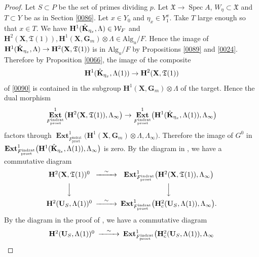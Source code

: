 \documentclass{amsart}
\theoremstyle{remark}
\numberwithin{equation}{section}
\newcommand{\tensor}{\mathbin{\otimes}}
\newcommand{\et}{\mathrm{et}}
\newcommand{\Gm}{\mathbf{G}_{m}}
\newcommand{\rat}{\mathrm{rat}}
\newcommand{\ind}{\mathrm{ind}}
\newcommand{\pro}{\mathrm{pro}}
\newcommand{\Alg}{\mathrm{Alg}}
\newcommand{\alg}[1]{\mathbf{#1}}
\DeclareMathOperator{\Spec}{Spec}
\DeclareMathOperator{\sheafext}{\alg{Ext}}
\begin{document}
\begin{proof}
	Let $S \subset P$ be the set of primes dividing $p$.
	Let $\mathfrak{X} \to \Spec A$, $W_{\eta} \subset \mathfrak{X}$ and $T \subset Y$
	be as in Section \ref{0086}.
	Let $x \in Y_{0}$ and $\eta_{x} \in Y_{1}^{x}$.
	Take $T$ large enough so that $x \in T$.
	We have $\alg{H}^{1}(\Hat{\alg{K}}_{\eta_{x}}, \Lambda) \in \mathcal{W}_{F}$
	and $\alg{H}^{2}(\alg{X}, \mathfrak{T}(1)), \alg{H}^{1}(\alg{X}, \Gm) \tensor \Lambda \in \Alg_{u} / F$.
	Hence the image of
	$\alg{H}^{1}(\Hat{\alg{K}}_{\eta_{x}}, \Lambda) \to \alg{H}^{2}(\alg{X}, \mathfrak{T}(1))$
	is in $\Alg_{u} / F$
	by Propositions \ref{0089} and \ref{0024}.
	Therefore by Proposition \ref{0066}, the image of the composite
		\[
				\alg{H}^{1}(\Hat{\alg{K}}_{\eta_{x}}, \Lambda(1))
			\to
				\alg{H}^{2}(\alg{X}, \mathfrak{T}(1))
		\]
	of \eqref{0090} is contained in the subgroup
	$\alg{H}^{1}(\alg{X}, \Gm) \tensor \Lambda$ of the target.
	Hence the dual morphism
		\[
				\sheafext^{1}_{F^{\ind\rat}_{\pro\et}} \bigl(
					\alg{H}^{2}(\alg{X}, \mathfrak{T}(1)),
					\Lambda_{\infty}
				\bigr)
			\to
				\sheafext^{1}_{F^{\ind\rat}_{\pro\et}} \bigl(
					\alg{H}^{1}(\Hat{\alg{K}}_{\eta_{x}}, \Lambda(1)),
					\Lambda_{\infty}
				\bigr)
		\]
	factors through
		$
			\sheafext^{1}_{F^{\ind\rat}_{\pro\et}} \bigl(
				\alg{H}^{1}(\alg{X}, \Gm) \tensor \Lambda,
				\Lambda_{\infty}
			\bigr)
		$.
	Therefore the image of $G^{0}$ in 
		$
			\sheafext^{1}_{F^{\ind\rat}_{\pro\et}} \bigl(
				\alg{H}^{1}(\Hat{\alg{K}}_{\eta_{x}}, \Lambda(1)),
				\Lambda_{\infty}
			\bigr)
		$
	is zero.
	By the diagram in \cite[Section 10.6, Proof of Proposition 10.1.5]{Suz24},
	we have a commutative diagram
		\[
			\begin{CD}
					\alg{H}^{2}(\alg{X}, \mathfrak{T}(1))^{0}
				@> \sim >>
					\sheafext^{1}_{F^{\ind\rat}_{\pro\et}} \bigl(
						\alg{H}^{2}(\alg{X}, \mathfrak{T}(1)),
						\Lambda_{\infty}
					\bigr)
				\\ @VVV @VVV \\
					\alg{H}^{2}(\alg{U}_{S}, \Lambda(1))^{0}
				@> \sim >>
					\sheafext^{1}_{F^{\ind\rat}_{\pro\et}} \bigl(
						\alg{H}^{2}_{c}(\alg{U}_{S}, \Lambda(1)),
						\Lambda_{\infty}
					\bigr).
			\end{CD}
		\]
	By the diagram in the proof of \cite[Proposition 10.5.5]{Suz24},
	we have a commutative diagram
		\[
			\begin{CD}
					\alg{H}^{2}(\alg{U}_{S}, \Lambda(1))^{0}
				@> \sim >>
					\sheafext^{1}_{F^{\ind\rat}_{\pro\et}} \bigl(
						\alg{H}^{2}_{c}(\alg{U}_{S}, \Lambda(1)),
						\Lambda_{\infty}

\end{CD}\]
\end{proof}
\end{document}

